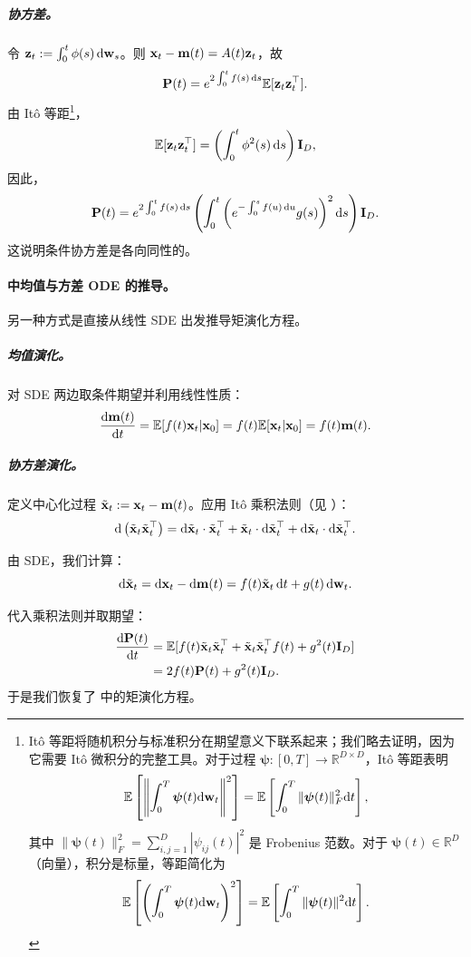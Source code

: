 \subparagraph{协方差。}
令 ${\mathbf{z}}_t := \int_0^t \phi(s) \mathop{}\!\mathrm{d} {\mathbf{w}}_s$。则 ${\mathbf{x}}_t - {\mathbf{m}}(t) = A(t) {\mathbf{z}}_t$，故
\[
{\mathbf{P}}(t) = e^{2\int_0^t f(s) \mathop{}\!\mathrm{d} s} \mathbb{E}[{\mathbf{z}}_t {\mathbf{z}}_t^\top].
\]
由 It\^o 等距\footnote{It\^o 等距将随机积分与标准积分在期望意义下联系起来；我们略去证明，因为它需要 It\^o 微积分的完整工具。对于过程 $\bm{\psi} : [0,T] \to \mathbb{R}^{D \times D}$，It\^o 等距表明
\[
\mathbb{E}\left[\left\| \int_0^T \bm{\psi}(t)   \mathrm{d}{\mathbf{w}}_t \right\|^2 \right]
= \mathbb{E}\left[\int_0^T \|\bm{\psi}(t)\|_F^2   \mathrm{d}t \right],
\]
其中 $\|\bm{\psi}(t)\|_F^2 = \sum_{i,j=1}^D |\psi_{ij}(t)|^2$ 是 Frobenius 范数。对于 $\bm{\psi}(t) \in \mathbb{R}^D$（向量），积分是标量，等距简化为
\[
\mathbb{E}\left[\left(\int_0^T \bm{\psi}(t)   \mathrm{d}{\mathbf{w}}_t\right)^2\right] = \mathbb{E}\left[\int_0^T \|\bm{\psi}(t)\|^2   \mathrm{d}t \right].
\]
}，
\[
\mathbb{E}[{\mathbf{z}}_t {\mathbf{z}}_t^\top] = \left( \int_0^t \phi^2(s) \mathop{}\!\mathrm{d} s \right) {\mathbf{I}}_D,
\]
因此，
\[
{\mathbf{P}}(t) = e^{2\int_0^t f(s) \mathop{}\!\mathrm{d} s} \left( \int_0^t \left( e^{-\int_0^s f(u) \mathop{}\!\mathrm{d} u} g(s) \right)^2 \mathop{}\!\mathrm{d} s \right) {\mathbf{I}}_D.
\]
这说明条件协方差是各向同性的。

\paragraph{ 中均值与方差 ODE 的推导。}
另一种方式是直接从线性 SDE  出发推导矩演化方程。


\subparagraph{均值演化。}
对 SDE 两边取条件期望并利用线性性质：
\[
\frac{\mathop{}\!\mathrm{d} {\mathbf{m}}(t)}{\mathop{}\!\mathrm{d} t} = \mathbb{E}[f(t) {\mathbf{x}}_t|{\mathbf{x}}_0] = f(t) \mathbb{E}[{\mathbf{x}}_t|{\mathbf{x}}_0] = f(t) {\mathbf{m}}(t).
\]

\vspace{0.3cm}

\subparagraph{协方差演化。}
定义中心化过程 $ \tilde{{\mathbf{x}}}_t := {\mathbf{x}}_t - {\mathbf{m}}(t) $。应用 It\^o 乘积法则（见 ）：
\[
\mathop{}\!\mathrm{d} \left( \tilde{{\mathbf{x}}}_t \tilde{{\mathbf{x}}}_t^\top \right)
= \mathop{}\!\mathrm{d} \tilde{{\mathbf{x}}}_t \cdot \tilde{{\mathbf{x}}}_t^\top 
+ \tilde{{\mathbf{x}}}_t \cdot \mathop{}\!\mathrm{d} \tilde{{\mathbf{x}}}_t^\top 
+ \mathop{}\!\mathrm{d} \tilde{{\mathbf{x}}}_t \cdot \mathop{}\!\mathrm{d} \tilde{{\mathbf{x}}}_t^\top.
\]

由 SDE，我们计算：
\[
\mathop{}\!\mathrm{d} \tilde{{\mathbf{x}}}_t = \mathop{}\!\mathrm{d} {\mathbf{x}}_t - \mathop{}\!\mathrm{d} {\mathbf{m}}(t) = f(t) \tilde{{\mathbf{x}}}_t  \mathop{}\!\mathrm{d} t + g(t)  \mathop{}\!\mathrm{d} {\mathbf{w}}_t.
\]

代入乘积法则并取期望：
\begin{align*}
    \frac{\mathop{}\!\mathrm{d} {\mathbf{P}}(t)}{\mathop{}\!\mathrm{d} t}
    &= \mathbb{E}[f(t) \tilde{{\mathbf{x}}}_t \tilde{{\mathbf{x}}}_t^\top + \tilde{{\mathbf{x}}}_t \tilde{{\mathbf{x}}}_t^\top f(t) + g^2(t) {\mathbf{I}}_D] \\
    &= 2 f(t) {\mathbf{P}}(t) + g^2(t) {\mathbf{I}}_D.
\end{align*}
于是我们恢复了  中的矩演化方程。




